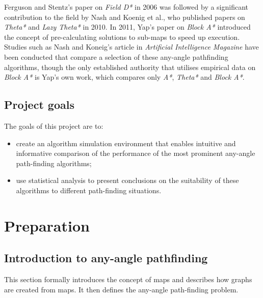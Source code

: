 \documentclass[12pt,notitlepage]{report}
\begin{document}
\noindent
Ferguson and Stentz's paper on {\em Field D*}\cite{FergusonStentz06} in 2006 was followed by a significant contribution to the field by Nash and Koenig et al., who published papers on {\em Theta*}\cite{Daniel10} and {\em Lazy Theta*}\cite{Nash10} in 2010. In 2011, Yap's paper on {\em Block A*}\cite{Yap11} introduced the concept of pre-calculating solutions to sub-maps to speed up execution.\\

\noindent
Studies such as Nash and Koneig's article in {\em Artificial Intelligence Magazine}\cite{Nash11} have been conducted that compare a selection of these any-angle pathfinding algorithms, though the only established authority that utilises empirical data on {\em Block A*} is Yap's own work\cite{Yap11}, which compares only {\em A*}, {\em Theta*} and {\em Block A*}.

\section {Project goals}


\noindent
The goals of this project are to:

\begin{itemize}
\item create an algorithm simulation environment that enables intuitive and informative comparison of the performance of the most prominent any-angle path-finding algorithms;
\item use statistical analysis to present conclusions on the suitability of these algorithms to different path-finding situations.
\end {itemize}

\cleardoublepage


\chapter{Preparation} 

\section{Introduction to any-angle pathfinding}

This section formally introduces the concept of maps and describes how graphs are created from maps. It then defines the any-angle path-finding problem.
\end{document}

